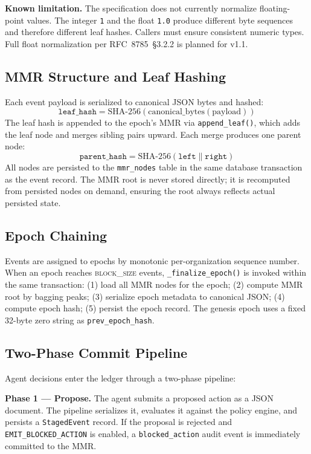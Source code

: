 \documentclass[sigconf,natbib=false]{acmart}
\begin{document}
\textbf{Known limitation.} The specification does not currently normalize
floating-point values. The integer \texttt{1} and the float \texttt{1.0}
produce different byte sequences and therefore different leaf hashes.
Callers must ensure consistent numeric types. Full float normalization per
RFC~8785~\S3.2.2 is planned for v1.1.

\subsection{MMR Structure and Leaf Hashing}

Each event payload is serialized to canonical JSON bytes and hashed:
\[
\texttt{leaf\_hash} = \text{SHA-256}(\text{canonical\_bytes}(\text{payload}))
\]
The leaf hash is appended to the epoch's MMR via \texttt{append\_leaf()},
which adds the leaf node and merges sibling pairs upward. Each merge
produces one parent node:
\[
\texttt{parent\_hash} = \text{SHA-256}(\texttt{left} \| \texttt{right})
\]
All nodes are persisted to the \texttt{mmr\_nodes} table in the same
database transaction as the event record. The MMR root is never stored
directly; it is recomputed from persisted nodes on demand, ensuring the
root always reflects actual persisted state.

\subsection{Epoch Chaining}

Events are assigned to epochs by monotonic per-organization sequence
number. When an epoch reaches \textsc{block\_size} events,
\texttt{\_finalize\_epoch()} is invoked within the same transaction:
(1) load all MMR nodes for the epoch; (2) compute MMR root by bagging
peaks; (3) serialize epoch metadata to canonical JSON; (4) compute epoch
hash; (5) persist the epoch record. The genesis epoch uses a fixed 32-byte
zero string as \texttt{prev\_epoch\_hash}.

\subsection{Two-Phase Commit Pipeline}

Agent decisions enter the ledger through a two-phase pipeline:

\textbf{Phase 1 --- Propose.} The agent submits a proposed action as a JSON
document. The pipeline serializes it, evaluates it against the policy
engine, and persists a \texttt{StagedEvent} record. If the proposal is
rejected and \texttt{EMIT\_BLOCKED\_ACTION} is enabled, a
\texttt{blocked\_action} audit event is immediately committed to the MMR.
\end{document}
